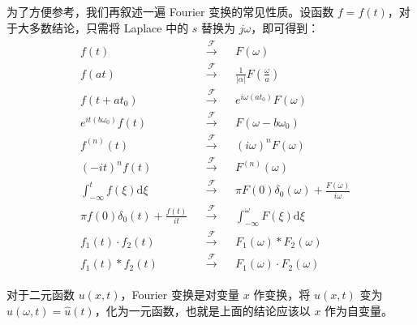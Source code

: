 \documentclass[UTF8]{report}
\theoremstyle{MyLineTheoremStyle} %
\theoremstyle{MyBlockTheoremStyle} %
\theoremstyle{MySubsubsectionStyle} %
\begin{document}
为了方便参考，我们再叙述一遍 Fourier 变换的常见性质。设函数 $f = f(t)$，对于大多数结论，只需将 Laplace 中的 $s$ 替换为 $j \omega$，即可得到：
\begin{gather}
\begin{aligned}
& f(t) &&\overset{\mathscr{F}}{\longrightarrow} && F(\omega) \\
& f(a t) &&\overset{\mathscr{F}}{\longrightarrow} && \frac{1}{|\alpha|} F(\frac{\omega}{a})\\
& f(t + a t_0) &&\overset{\mathscr{F}}{\longrightarrow} && e^{i \omega (at_0)}F(\omega)\\
& e^{it (b \omega_0)} f(t) &&\overset{\mathscr{F}}{\longrightarrow} && F(\omega - b \omega_0)\\
& f^{(n)}(t) &&\overset{\mathscr{F}}{\longrightarrow} && (i \omega)^n F(\omega)\\
& (-i t)^n f(t) &&\overset{\mathscr{F}}{\longrightarrow} &&  F^{(n)}(\omega)\\
& \int_{-\infty}^{t} f(\xi) \mathrm{d}\xi &&\overset{\mathscr{F}}{\longrightarrow} && \pi F(0) \delta_0(\omega) + \frac{F(\omega)}{i \omega}\\
& \pi f(0) \delta_0(t) + \frac{f(t)}{i t} &&\overset{\mathscr{F}}{\longrightarrow} && \int_{-\infty}^{\omega} F(\xi) \mathrm{d}\xi\\
& f_1(t)\cdot f_2(t) &&\overset{\mathscr{F}}{\longrightarrow} && F_1(\omega) * F_2(\omega)\\
& f_1(t) * f_2(t)  &&\overset{\mathscr{F}}{\longrightarrow} && F_1(\omega) \cdot F_2(\omega)
\end{aligned}
\end{gather}


对于二元函数 $u(x, t)$，Fourier 变换是对变量 $x$ 作变换，将 $u(x, t)$ 变为 $\hat{u}(\omega, t) = \hat{u}(t)$，化为一元函数，也就是上面的结论应该以 $x$ 作为自变量。
\end{document}
